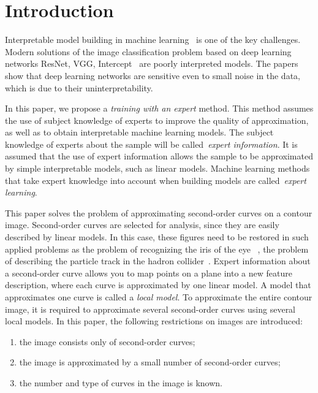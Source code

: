 \section{Introduction}
\label{intro}
Interpretable model building in machine learning~\cite{Ribeiro2016} is one of the key challenges.
Modern solutions of the image classification problem based on deep learning networks ResNet, VGG, Intercept~\cite{Kaiming2015} are poorly interpreted models.
The papers~\cite{Han2020} \cite{Xingjun2019} \cite{Akhtar2018} show that deep learning networks are sensitive even to small noise in the data, which is due to their uninterpretability.

In this paper, we propose a \textit {training with an expert} method.
This method assumes the use of subject knowledge of experts to improve the quality of approximation, as well as to obtain interpretable machine learning models.
The subject knowledge of experts about the sample will be called~\textit {expert information}.
It is assumed that the use of expert information allows the sample to be approximated by simple interpretable models, such as linear models. Machine learning methods that take expert knowledge into account when building models are called~\textit {expert learning}.

This paper solves the problem of approximating second-order curves on a contour image. Second-order curves are selected for analysis, since they are easily described by linear models. In this case, these figures need to be restored in such applied problems as the problem of recognizing the iris of the eye~\cite{Matveev2010} \cite{Matveev2014} \cite{Bowyer2010}, the problem of describing the particle track in the hadron collider~\cite{Dalila2018}. Expert information about a second-order curve allows you to map points on a plane into a new feature description, where each curve is approximated by one linear model. A model that approximates one curve is called a \textit {local model}. To approximate the entire contour image, it is required to approximate several second-order curves using several local models. In this paper, the following restrictions on images are introduced:
\begin{enumerate}
	\item the image consists only of second-order curves;
	\item the image is approximated by a small number of second-order curves;
	\item the number and type of curves in the image is known.
\end{enumerate}

